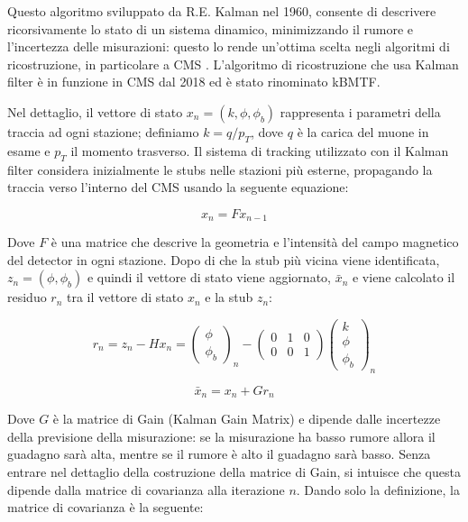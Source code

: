 Questo algoritmo sviluppato da R.E. Kalman nel 1960, consente di descrivere ricorsivamente lo stato di un sistema dinamico, minimizzando il rumore e l'incertezza delle misurazioni: questo lo rende un'ottima scelta negli algoritmi di ricostruzione, in particolare a CMS \cite{welch1995introduction}. L'algoritmo di ricostruzione che usa Kalman filter è in funzione in CMS dal 2018 ed è stato rinominato kBMTF. 

Nel dettaglio, il vettore di stato $x_n = (k, \phi, \phi_b)$ rappresenta i parametri della traccia ad ogni stazione; definiamo $k = q/p_T$, dove $q$ è la carica del muone in esame e $p_T$ il momento trasverso. Il sistema di tracking utilizzato con il Kalman filter considera inizialmente le stubs nelle stazioni più esterne, propagando la traccia verso l'interno del CMS usando la seguente equazione:

\begin{equation}
  \label{eq:KalmanFilterEq}
    x_n = F x_{n-1}
\end{equation}

Dove $F$ è una matrice che descrive la geometria e l'intensità del campo magnetico del detector in ogni stazione.
Dopo di che la stub più vicina viene identificata, $z_n = (\phi, \phi_b)$ e quindi il vettore di stato viene aggiornato, $\bar{x}_n$ e viene calcolato il residuo $r_n$ tra il vettore di stato $x_n$ e la stub $z_n$: 

\begin{equation}
  \label{eq:KalmanFilterEq2}
    r_n = z_n - Hx_n = \left( \begin{matrix}
      \phi \\
      \phi_b
    \end{matrix}\right)_n - \left( \begin{matrix}
      0 & 1 & 0 \\ 
      0 & 0 & 1
    \end{matrix}\right)
    \left(\begin{matrix}
      k \\
      \phi \\
      \phi_b
    \end{matrix}\right)_n
\end{equation}

\begin{equation}
  \label{eq:KalmanFilterEq3}
    \bar{x}_n = x_n + Gr_n
\end{equation}

Dove $G$ è la matrice di Gain (Kalman Gain Matrix) e dipende dalle incertezze della previsione della misurazione: se la misurazione ha basso rumore allora il guadagno sarà alta, mentre se il rumore è alto il guadagno sarà basso. Senza entrare nel dettaglio della costruzione della matrice di Gain, si intuisce che questa dipende dalla matrice di covarianza alla iterazione $n$. Dando solo la definizione, la matrice di covarianza è la seguente:


